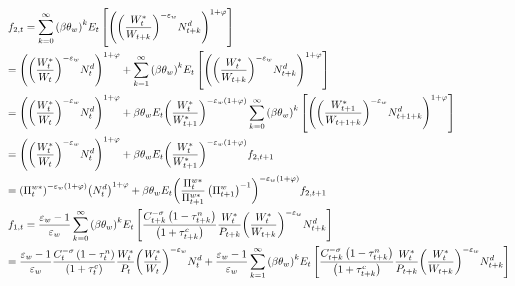 \documentclass[12pt,a4paper]{article}
\begin{document}
\[\begin{gathered}
  {f_{2,t}} = \sum\limits_{k = 0}^\infty  {{{\left( {\beta {\theta _w}} \right)}^k}} {E_t}\left[ {{{\left( {{{\left( {\frac{{W_t^*}}{{{W_{t + k}}}}} \right)}^{ - {\varepsilon _w}}}N_{t + k}^d} \right)}^{1 + \varphi }}} \right] \hfill \\
   = {\left( {{{\left( {\frac{{W_t^*}}{{{W_t}}}} \right)}^{ - {\varepsilon _w}}}N_t^d} \right)^{1 + \varphi }} + \sum\limits_{k = 1}^\infty  {{{\left( {\beta {\theta _w}} \right)}^k}} {E_t}\left[ {{{\left( {{{\left( {\frac{{W_t^*}}{{{W_{t + k}}}}} \right)}^{ - {\varepsilon _w}}}N_{t + k}^d} \right)}^{1 + \varphi }}} \right] \hfill \\
   = {\left( {{{\left( {\frac{{W_t^*}}{{{W_t}}}} \right)}^{ - {\varepsilon _w}}}N_t^d} \right)^{1 + \varphi }} + \beta {\theta _w}{E_t}{\left( {\frac{{W_t^*}}{{W_{t + 1}^*}}} \right)^{ - {\varepsilon _w}\left( {1 + \varphi } \right)}}\sum\limits_{k = 0}^\infty  {{{\left( {\beta {\theta _w}} \right)}^k}} \left[ {{{\left( {{{\left( {\frac{{W_{t + 1}^*}}{{{W_{t + 1 + k}}}}} \right)}^{ - {\varepsilon _w}}}N_{t + 1 + k}^d} \right)}^{1 + \varphi }}} \right] \hfill \\
   = {\left( {{{\left( {\frac{{W_t^*}}{{{W_t}}}} \right)}^{ - {\varepsilon _w}}}N_t^d} \right)^{1 + \varphi }} + \beta {\theta _w}{E_t}{\left( {\frac{{W_t^*}}{{W_{t + 1}^*}}} \right)^{ - {\varepsilon _w}\left( {1 + \varphi } \right)}}{f_{2,t + 1}} \hfill \\
   ={\left( {\Pi _t^{w*}} \right)^{ - {\varepsilon _w}\left( {1 + \varphi } \right)}}{\left( {N_t^d} \right)^{1 + \varphi }} + \beta {\theta _w}{E_t}{\left( {\frac{{\Pi _t^{w*}}}{{\Pi _{t + 1}^{w*}}}\left(\Pi _{t + 1}^w\right)^{-1}} \right)^{ - {\varepsilon _w}\left( {1 + \varphi } \right)}}{f_{2,t + 1}}\hfill\\
  {f_{1,t}} = \frac{{{\varepsilon _w} - 1}}{{{\varepsilon _w}}}\sum\limits_{k = 0}^\infty  {{{\left( {\beta {\theta _w}} \right)}^k}} {E_t}\left[ {\frac{{C_{t + k}^{ - \sigma }\left( {1 - \tau _{t + k}^n} \right)}}{{\left( {1 + \tau _{t + k}^c} \right)}}\frac{{W_t^*}}{{{P_{t + k}}}}{{\left( {\frac{{W_t^*}}{{{W_{t + k}}}}} \right)}^{ - {\varepsilon _w}}}N_{t + k}^d} \right] \hfill \\
   = \frac{{{\varepsilon _w} - 1}}{{{\varepsilon _w}}}\frac{{C_t^{ - \sigma }\left( {1 - \tau _t^n} \right)}}{{\left( {1 + \tau _t^c} \right)}}\frac{{W_t^*}}{{{P_t}}}{\left( {\frac{{W_t^*}}{{{W_t}}}} \right)^{ - {\varepsilon _w}}}N_t^d + \frac{{{\varepsilon _w} - 1}}{{{\varepsilon _w}}}\sum\limits_{k = 1}^\infty  {{{\left( {\beta {\theta _w}} \right)}^k}} {E_t}\left[ {\frac{{C_{t + k}^{ - \sigma }\left( {1 - \tau _{t + k}^n} \right)}}{{\left( {1 + \tau _{t + k}^c} \right)}}\frac{{W_t^*}}{{{P_{t + k}}}}{{\left( {\frac{{W_t^*}}{{{W_{t + k}}}}} \right)}^{ - {\varepsilon _w}}}N_{t + k}^d} \right] \hfill \\

\end{gathered}\]
\end{document}
